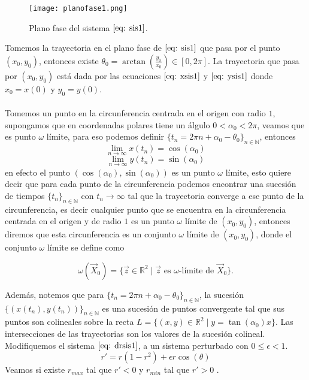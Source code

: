\begin{figure}[h]
	\centering
	\texttt{[image: planofase1.png]}
	\caption{Plano fase del sistema $\eqref{eq: sis1}$.}
\end{figure}

Tomemos la trayectoria en el plano fase de $\eqref{eq: sis1}$ que pasa por el punto
$(x_0,y_0)$, entonces existe $\theta_0=\arctan(\frac{y_0}{x_0})\in[0,2\pi]$.
La trayectoria que pasa por $(x_0,y_0)$ está dada por las ecuaciones $\eqref{eq: xsis1}$ y
$\eqref{eq: ysis1}$ donde $x_0=x(0)$ y $y_0=y(0)$.\\
\\Tomemos un punto en la circunferencia centrada en el origen con radio $1$,
supongamos que
en coordenadas polares tiene un álgulo $0<\alpha_0<2\pi$, veamos que es punto $\omega$ límite, para eso podemos definir
$\{t_n=2\pi n+\alpha_0-\theta_0\}_{n\in \mathbb{N}}$, entonces
$$\lim_{n\to\infty}x(t_n)=\cos(\alpha_0)$$
$$\lim_{n\to\infty}y(t_n)=\sin(\alpha_0)$$
en efecto el punto $(\cos(\alpha_0),\sin(\alpha_0))$ es un punto $\omega$ límite, esto
quiere decir que para cada punto de la circunferencia podemos encontrar
una sucesión de tiempos $\{t_n\}_{n\in \mathbb{N}}$ con $t_n\to\infty$ tal que la
trayectoria converge a ese punto de la circunferencia, es decir cualquier punto que se encuentra en la
circunferencia centrada en el origen y de radio $1$ es un punto $\omega$ límite de $(x_0,y_0)$,
entonces diremos que esta circunferencia es un conjunto $\omega$ límite de $(x_0,y_0)$, donde
el conjunto $\omega$ límite se define como

$$\omega(\vec{X}_0)=\{\vec{z}\in\mathbb{R}^2\mid\vec{z} \text{  es  } \omega\text{-límite de  } \vec{X}_0\}.$$

Además, notemos que para $\{t_n=2\pi n+\alpha_0-\theta_0\}_{n\in \mathbb{N}}$,
la sucesión $\{(x(t_n),y(t_n))\}_{n\in\mathbb{N}}$ es una sucesión
de puntos convergente tal que sus puntos son colineales sobre la recta
$L=\{(x,y)\in\mathbb{R}^2\mid y=\tan(\alpha_0)x \}$. Las intersecciones de las trayectorias
son los valores de la sucesión colineal.\\

Modifiquemos el sistema $\eqref{eq: drsis1}$, a un sistema perturbado
con $0\leq\epsilon<1$.
\begin{equation}\label{eq: drmod}
	r'=r(1-r^2)+\epsilon r\cos(\theta)
\end{equation}
Veamos si existe $r_{max}$ tal que $r'<0$ y $r_{min}$ tal que $r'>0$ \cite{bender2013advanced}.\\

